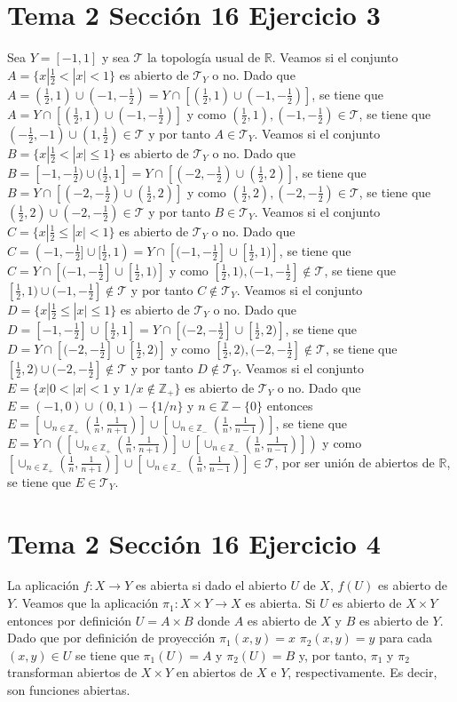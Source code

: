 \documentclass{article}
\begin{document}
\section{Tema 2 Sección 16 Ejercicio 3}
Sea $Y=[-1,1]$ y sea $\mathcal{T}$ la topología usual de $\mathbb{R}$.
Veamos si el conjunto $A=\{x|\frac{1}{2}<|x|<1\}$ es abierto de $\mathcal{T}_{Y}$ o no. Dado que $A=(\frac{1}{2},1)\cup (-1,-\frac{1}{2})=Y\cap[(\frac{1}{2},1)\cup (-1,-\frac{1}{2})]$,  se tiene que $A=Y\cap[(\frac{1}{2},1)\cup (-1,-\frac{1}{2})]$ y como $(\frac{1}{2},1), (-1,-\frac{1}{2})\in \mathcal{T}$, se tiene que $(-\frac{1}{2},-1)\cup (1,\frac{1}{2})\in\mathcal{T}$ y por tanto $A\in \mathcal{T}_Y$.
Veamos si el conjunto $B=\{x|\frac{1}{2}<|x|\leq 1\}$ es abierto de $\mathcal{T}_{Y}$ o no. Dado que $B=[-1,-\frac{1}{2})\cup (\frac{1}{2},1]=Y\cap[(-2,-\frac{1}{2})\cup (\frac{1}{2},2)]$, se tiene que $B=Y\cap[(-2,-\frac{1}{2})\cup (\frac{1}{2},2)]$ y como $(\frac{1}{2},2), (-2,-\frac{1}{2})\in \mathcal{T}$, se tiene que $(\frac{1}{2},2)\cup (-2,-\frac{1}{2})\in\mathcal{T}$ y por tanto $B\in \mathcal{T}_Y$.
Veamos si el conjunto $C=\{x|\frac{1}{2}\leq|x|<1\}$ es abierto de $\mathcal{T}_{Y}$ o no. Dado que $C=(-1,-\frac{1}{2}]\cup [\frac{1}{2},1)=Y\cap[(-1,-\frac{1}{2}]\cup [\frac{1}{2},1)]$, se tiene que $C=Y\cap[(-1,-\frac{1}{2}]\cup [\frac{1}{2},1)]$ y como $[\frac{1}{2},1), (-1,-\frac{1}{2}]\notin \mathcal{T}$, se tiene que $[\frac{1}{2},1)\cup (-1,-\frac{1}{2}]\notin\mathcal{T}$ y por tanto $C\notin \mathcal{T}_Y$. Veamos si el conjunto $D=\{x|\frac{1}{2}\leq |x|\leq 1\}$ es abierto de $\mathcal{T}_{Y}$ o no. Dado que $D=[-1,-\frac{1}{2}]\cup [\frac{1}{2},1]=Y\cap[(-2,-\frac{1}{2}]\cup [\frac{1}{2},2)]$, se tiene que $D=Y\cap[(-2,-\frac{1}{2}]\cup [\frac{1}{2},2)]$ y como $[\frac{1}{2},2), (-2,-\frac{1}{2}]\notin \mathcal{T}$, se tiene que $[\frac{1}{2},2)\cup (-2,-\frac{1}{2}]\notin\mathcal{T}$ y por tanto $D\notin \mathcal{T}_Y$.
Veamos si el conjunto $E=\{x|0<|x|<1\text{ y }1/x\notin \mathbb{Z}_+\}$ es abierto de $\mathcal{T}_{Y}$ o no. Dado que $E=(-1,0)\cup(0,1)-\{1/n\}$ y $n\in \mathbb{Z}-\{0\}$ entonces $E=[\cup_{n\in \mathbb{Z}_+}(\frac{1}{n},\frac{1}{n+1})]\cup[\cup_{n\in \mathbb{Z}_-}(\frac{1}{n},\frac{1}{n-1})]$, se tiene que $E=Y\cap([\cup_{n\in \mathbb{Z}_+}(\frac{1}{n},\frac{1}{n+1})]\cup[\cup_{n\in \mathbb{Z}_-}(\frac{1}{n},\frac{1}{n-1})])$ y como $[\cup_{n\in \mathbb{Z}_+}(\frac{1}{n},\frac{1}{n+1})]\cup[\cup_{n\in \mathbb{Z}_-}(\frac{1}{n},\frac{1}{n-1})]\in \mathcal{T}$, por ser unión de abiertos de $\mathbb{R}$, se tiene que $E\in \mathcal{T}_Y$.
\section{Tema 2 Sección 16 Ejercicio 4}
La aplicación $f:X\rightarrow Y$ es abierta si dado el abierto $U$  de $X$, $f(U)$ es abierto de $Y$. Veamos que la aplicación $\pi_1:X\times Y\rightarrow X$ es abierta. Si $U$ es abierto de $X\times Y$ entonces por definición $U=A\times B$ donde $A$ es abierto de $X$ y $B$ es abierto de $Y$. Dado que por definición de proyección $\pi_1(x,y)=x$ $\pi_2(x,y)=y$ para cada $(x,y)\in U$ se tiene que $\pi_1(U)=A$ y $\pi_2(U)=B$ y, por tanto, $\pi_1$ y $\pi_2$ transforman abiertos de $X\times Y$ en abiertos de $X$ e $Y$, respectivamente. Es decir, son funciones abiertas.
\end{document}
